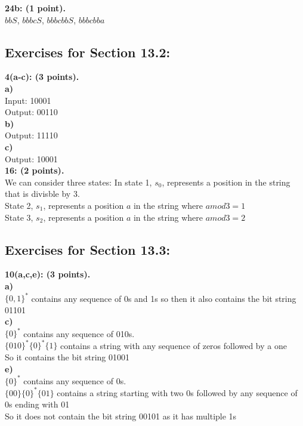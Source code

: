 \documentclass[12pt]{article}  %
\begin{document}
\noindent
{\bf 24b: (1 point).} \\
$bbS$, $bbbcS$, $bbbcbbS$, $bbbcbba$\\

\clearpage

\subsection*{Exercises for Section 13.2:}     

\noindent
{\bf 4(a-c): (3 points).} \\
{\bf a)}\\
Input: 10001\\
Output: 00110\\
{\bf b)}\\
Output: 11110\\
{\bf c)}\\
Output: 10001\\


\noindent
{\bf 16: (2 points).} \\
We can consider three states:
In state 1, $s_0$, represents a position in the string that is divisble by 3.\\
State 2, $s_1$, represents a position $a$ in the string where $a mod 3 = 1$\\
State 3, $s_2$, represents a position $a$ in the string where $a mod 3 = 2$\\

\clearpage

\subsection*{Exercises for Section 13.3:}     

\noindent
{\bf 10(a,c,e): (3 points).} \\
{\bf a)}\\
$\{0,1\}^*$ contains any sequence of 0s and 1s so then it also contains the bit string 01101\\
{\bf c)}\\
$\{0\}^*$ contains any sequence of 010s.\\
$\{010\}^*\{0\}^*\{1\}$ contains a string with any sequence of zeros followed by a one\\
So it contains the bit string 01001\\
{\bf e)}\\
$\{0\}^*$ contains any sequence of 0s.\\
$\{00\}\{0\}^*\{01\}$ contains a string starting with two 0s followed by any sequence of 0s ending with 01\\
So it does not contain the bit string 00101 as it has multiple 1s\\
\end{document}
